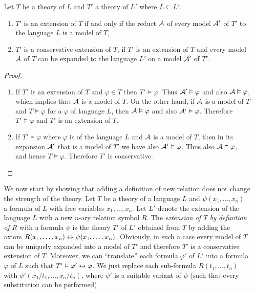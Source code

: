 \begin{lemma}
Let $T$ be a theory of $L$ and $T'$ a theory of $L'$ where $L \subseteq L'$.
\begin{enumerate}
	\item $T'$ is an extension of $T$ if and only if the reduct $\mathcal{A}$ of every model $\mathcal{A}'$ of $T'$ to the language $L$ is a model of $T$,
	\item $T'$ is a conservative extension of $T$, if $T'$ is an extension of $T$ and every model $\mathcal{A}$ of $T$ can be expanded to the language $L'$ on a model $\mathcal{A}'$ of $T'$.
\end{enumerate}
\end{lemma}
\begin{proof}
\begin{enumerate}
  \item If $T'$ is an extension of $T$ and $\varphi \in T$ then $T' \vDash \varphi$. Thus $\mathcal{A}' \vDash \varphi$ and also $\mathcal{A} \vDash \varphi$, which implies that $\mathcal{A}$ is a model of $T$. On the other hand, if $\mathcal{A}$ is a model of $T$ and $T \vDash \varphi$ for a $\varphi$ of language $L$, then $\mathcal{A} \vDash \varphi$ and also $\mathcal{A}' \vDash \varphi$. Therefore $T' \vDash \varphi$ and $T'$ is an extension of $T$.
  \item If $T' \vDash \varphi$ where $\varphi$ is of the language $L$ and $\mathcal{A}$ is a model of $T$, then in its expansion $\mathcal{A}'$ that is a model of $T'$ we have also $\mathcal{A}' \vDash \varphi$. Thus also $\mathcal{A} \vDash \varphi$, and hence $T \vDash \varphi$. Therefore $T'$ is conservative.
\end{enumerate}
\vspace{-\baselineskip}
\end{proof}

We now start by showing that adding a definition of new relation does not change the strength of the theory. Let $T$ be a theory of a language $L$ and $\psi(x_1, \dots, x_n)$ a formula of $L$ with free variables $x_1, \dots, x_n$. Let $L'$ denote the extension of the language $L$ with a new $n$-ary relation symbol $R$. The \emph{extension of $T$ by definition of $R$} with a formula $\psi$ is the theory $T'$ of $L'$ obtained from $T$ by adding the axiom $R(x_1, \dots, x_n) \leftrightarrow \psi(x_1, \dots, x_n)$. Obviously, in such a case every model of $T$ can be uniquely expanded into a model of $T'$ and therefore $T'$ is a conservative extension of $T$. Moreover, we can ``translate'' each formula $\varphi'$ of $L'$ into a formula $\varphi$ of $L$ such that $T' \vDash \varphi' \leftrightarrow \varphi$. We just replace each sub-formula $R(t_1, \dots, t_n)$ with $\psi'(x_1/t_1, \dots, x_n/t_n)$, where $\psi'$ is a suitable variant of $\psi$ (such that every substitution can be performed).

